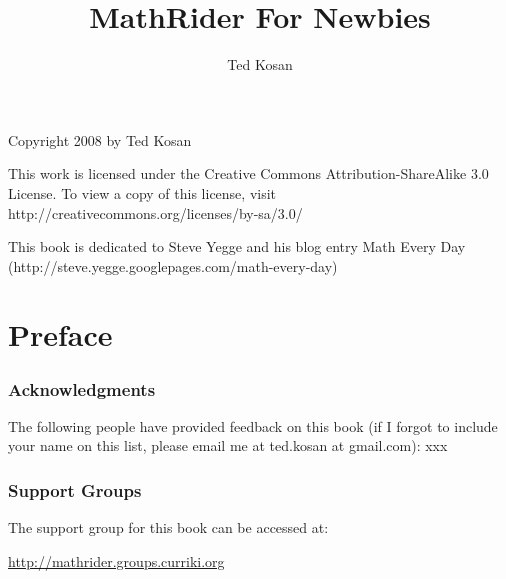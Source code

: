 \documentclass[12pt,oneside]{book}
\begin{document}
\frontmatter
\title{MathRider For Newbies}
\author{Ted Kosan}
\maketitle

\begin{center}
\begin{minipage}{3in}

{\centering
Copyright \textsf{{\textcopyright}} 2008 by Ted Kosan
\par}


This work is licensed under the Creative Commons
Attribution{}-ShareAlike 3.0 License. To view a copy of this license,
visit http://creativecommons.org/licenses/by{}-sa/3.0/
\end{minipage}
\end{center}

\linenumbers


This book is dedicated to Steve Yegge and his blog entry
{\textquotedbl}Math Every Day{\textquotedbl}
(http://steve.yegge.googlepages.com/math{}-every{}-day)


\renewcommand\contentsname{Table of Contents}
\tableofcontents
\chapter*{Preface}


\subsection{Acknowledgments}
The following people have provided feedback on this book (if I forgot to include your name on this list, please email me at ted.kosan at gmail.com):  xxx


\subsection[Support Groups]{Support Groups}
The support group for this book can be accessed at:

\href{http://mathrider.groups.curriki.org}{http://mathrider.groups.curriki.org}



\mainmatter
\addtolength{\parskip}{\baselineskip}
\parindent 0pt		  %
\end{document}
